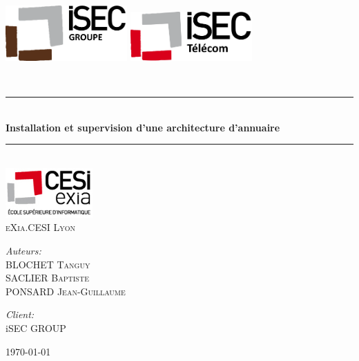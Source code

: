 \newcommand{\HRule}{\rule{\linewidth}{0.5mm}}


\begin{titlepage}
\begin{center}

\includegraphics[width=0.35\textwidth]{img/Logo-groupe.png}
\hspace{5cm}
\includegraphics[width=0.35\textwidth]{img/Logo-telecom.png}~\\[1cm]
\vspace{1cm}


\textsc{\Large }\\[0.5cm]

\HRule \\[0.4cm]

{\huge \bfseries
Installation et supervision d'une architecture d'annuaire \\[0.4cm] }

\HRule \\[2cm]
\includegraphics[width=0.25\textwidth]{img/logo_exia.jpg}~\\[1cm]
\textsc{\LARGE eXia.CESI Lyon}\\[1.5cm]

\vspace{2.5cm}

\begin{minipage}{0.5\textwidth}
\begin{flushleft} \large
\emph{Auteurs:}\\
BLOCHET \textsc{Tanguy}\\
SACLIER \textsc{Baptiste}\\
PONSARD \textsc{Jean-Guillaume}
\end{flushleft}
\end{minipage}
\begin{minipage}{0.4\textwidth}
\begin{flushright} \large
\emph{Client:} \\
iSEC \textsc{GROUP}
\end{flushright}
\end{minipage}

\vfill

{\large \today}

\end{center}
\end{titlepage}

\newpage
~
\thispagestyle{empty}
\newpage

\tableofcontents
\thispagestyle{empty}
\setcounter{page}{0}

\renewcommand{\arraystretch}{1.5}

~
\thispagestyle{empty}
\setcounter{page}{0}
\newpage